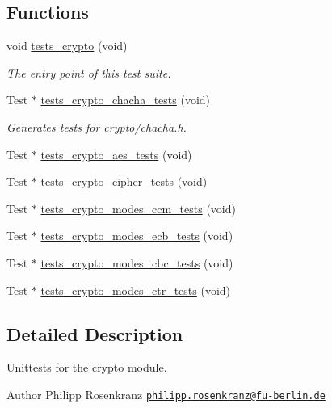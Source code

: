 \subsection*{Functions}
\begin{DoxyCompactItemize}
\item 
void \hyperlink{group__unittests_ga910f269e2fc5cd756415b49feb82eaca}{tests\+\_\+crypto} (void)
\begin{DoxyCompactList}\small\item\em The entry point of this test suite. \end{DoxyCompactList}\item 
Test $\ast$ \hyperlink{group__unittests_ga57ccd7e24b05012c775da48c9d521939}{tests\+\_\+crypto\+\_\+chacha\+\_\+tests} (void)
\begin{DoxyCompactList}\small\item\em Generates tests for crypto/chacha.\+h. \end{DoxyCompactList}\item 
Test $\ast$ \hyperlink{group__unittests_ga19bbedd30b2147c5418e225af2ce5d73}{tests\+\_\+crypto\+\_\+aes\+\_\+tests} (void)
\item 
Test $\ast$ \hyperlink{group__unittests_ga0da52ebef74d5bf263ce63858f7dea0c}{tests\+\_\+crypto\+\_\+cipher\+\_\+tests} (void)
\item 
Test $\ast$ \hyperlink{group__unittests_gadf1db8c6d373f13fccc185fdf2b43be6}{tests\+\_\+crypto\+\_\+modes\+\_\+ccm\+\_\+tests} (void)
\item 
Test $\ast$ \hyperlink{group__unittests_ga76fd240d06e873ffb3cd5e75c7407de8}{tests\+\_\+crypto\+\_\+modes\+\_\+ecb\+\_\+tests} (void)
\item 
Test $\ast$ \hyperlink{group__unittests_gada776e0b50a5f95f2f3eb86d94d83791}{tests\+\_\+crypto\+\_\+modes\+\_\+cbc\+\_\+tests} (void)
\item 
Test $\ast$ \hyperlink{group__unittests_ga504b19a263d14508528b1c378a3edee5}{tests\+\_\+crypto\+\_\+modes\+\_\+ctr\+\_\+tests} (void)
\end{DoxyCompactItemize}


\subsection{Detailed Description}
Unittests for the {\ttfamily crypto} module. 

\begin{DoxyAuthor}{Author}
Philipp Rosenkranz \href{mailto:philipp.rosenkranz@fu-berlin.de}{\tt philipp.\+rosenkranz@fu-\/berlin.\+de} 
\end{DoxyAuthor}
